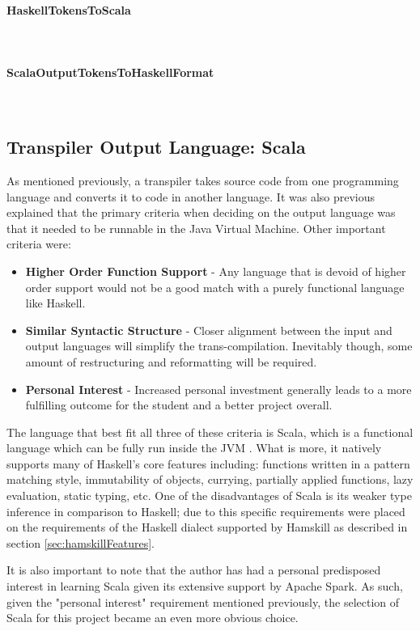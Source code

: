 \documentclass{report}
\newcommand{\myparagraph}[1]{\paragraph{#1}\mbox{}\\}
\begin{document}
\myparagraph{HaskellTokensToScala}

\myparagraph{ScalaOutputTokensToHaskellFormat}


\subsection{Transpiler Output Language: Scala}

As mentioned previously, a transpiler takes source code from one programming language and converts it to code in another language.  It was also previous explained that the primary criteria when deciding on the output language was that it needed to be runnable in the Java Virtual Machine.  Other important criteria were:

\begin{itemize}

	\item \textbf{Higher Order Function Support} - Any language that is devoid of higher order support would not be a good match with a purely functional language like Haskell.
	
	\item \textbf{Similar Syntactic Structure} - Closer alignment between the input and output languages will simplify the trans-compilation.  Inevitably though, some amount of restructuring and reformatting will be required.  
	
	\item \textbf{Personal Interest} - Increased personal investment generally leads to a more fulfilling outcome for the student and a better project overall.  

\end{itemize}

The language that best fit all three of these criteria is Scala, which is a functional language which can be fully run inside the JVM \cite{whatIsScala}. What is more, it natively supports many of Haskell's core features including: functions written in a pattern matching style, immutability of objects, currying, partially applied functions, lazy evaluation, static typing, etc.  One of the disadvantages of Scala is its weaker type inference in comparison to Haskell; due to this specific requirements were placed on the requirements of the Haskell dialect supported by Hamskill as described in section \ref{sec:hamskillFeatures}.

It is also important to note that the author has had a personal predisposed interest in learning Scala given its extensive support by Apache Spark.  As such, given the "personal interest" requirement mentioned previously, the selection of Scala for this project became an even more obvious choice.
\end{document}
